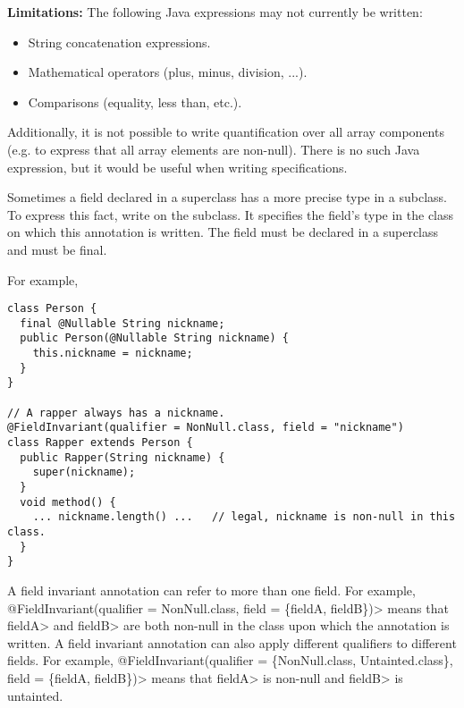 \textbf{Limitations:}
The following Java expressions may not currently be written:
\begin{itemize}
\item String concatenation expressions.
\item Mathematical operators (plus, minus, division, ...).
\item Comparisons (equality, less than, etc.).
\end{itemize}

Additionally, it is not possible to write
quantification over all array components (e.g. to express that all
  array elements are non-null).  There is no such Java expression, but it
  would be useful when writing specifications.


Sometimes a field declared in a superclass has a more precise type in a
subclass.  To express this fact, write
 on the subclass. It specifies
the field's type in the class on which this annotation is written.
The field must be declared in a superclass and
must be final.


For example,
\begin{Verbatim}
class Person {
  final @Nullable String nickname;
  public Person(@Nullable String nickname) {
    this.nickname = nickname;
  }
}

// A rapper always has a nickname.
@FieldInvariant(qualifier = NonNull.class, field = "nickname")
class Rapper extends Person {
  public Rapper(String nickname) {
    super(nickname);
  }
  void method() {
    ... nickname.length() ...   // legal, nickname is non-null in this class.
  }
}
\end{Verbatim}
 A field invariant annotation can refer to more than one field. For example,
\<@FieldInvariant(qualifier = NonNull.class, field = \{fieldA, fieldB\})> means
that \<fieldA> and \<fieldB> are both non-null in the class upon which the
annotation is written.  A field invariant annotation
can also apply different qualifiers to different fields. For example,
\<@FieldInvariant(qualifier = \{NonNull.class, Untainted.class\}, field =
\{fieldA, fieldB\})> means that \<fieldA> is non-null and \<fieldB> is untainted.


